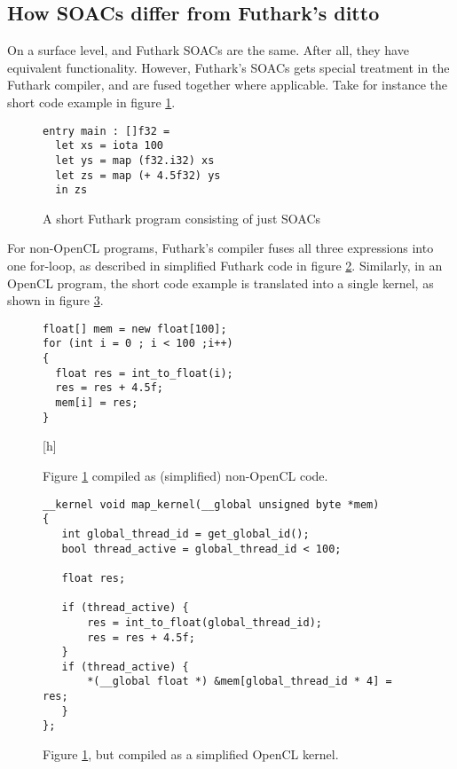\subsection*{How \fshark{} SOACs differ from Futhark's ditto}
On a surface level, \fshark{} and Futhark SOACs are the same. After all, they
have equivalent functionality.
However, Futhark's SOACs gets special treatment in the Futhark compiler, and are
fused together where applicable.
Take for instance the short code example in figure \ref{fig:futharkfusion}.

\begin{figure}[h]
  \centering
\begin{lstlisting}[language=Futhark]
entry main : []f32 =
  let xs = iota 100
  let ys = map (f32.i32) xs
  let zs = map (+ 4.5f32) ys
  in zs
\end{lstlisting}
  \caption{A short Futhark program consisting of just SOACs}
  \label{fig:futharkfusion}
\end{figure}

For non-OpenCL programs, Futhark's compiler fuses all three expressions into one for-loop, as described
in simplified Futhark \csharp{} code in figure \ref{fig:pseudofusion}.
Similarly, in an OpenCL program, the short code example is translated into a
single kernel, as shown in figure \ref{fig:pseudokernel}.

\begin{figure}[h]
  \centering
\begin{verbatim}
float[] mem = new float[100];
for (int i = 0 ; i < 100 ;i++)
{
  float res = int_to_float(i);
  res = res + 4.5f;
  mem[i] = res;
}
\end{verbatim}[h]
  \caption{Figure \ref{fig:futharkfusion} compiled as (simplified) non-OpenCL
    \csharp{} code.}
  \label{fig:pseudofusion}
\end{figure}

\begin{figure}
  \centering
\begin{verbatim}
__kernel void map_kernel(__global unsigned byte *mem)
{
   int global_thread_id = get_global_id();
   bool thread_active = global_thread_id < 100;

   float res;

   if (thread_active) {
       res = int_to_float(global_thread_id);
       res = res + 4.5f;
   }
   if (thread_active) {
       *(__global float *) &mem[global_thread_id * 4] = res;
   }
};
\end{verbatim}
  \caption{Figure \ref{fig:futharkfusion}, but compiled as a simplified OpenCL kernel.}
  \label{fig:pseudokernel}
\end{figure}


